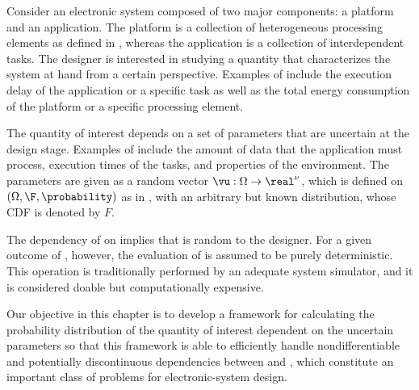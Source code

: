 Consider an electronic system composed of two major components: a platform and
an application. The platform is a collection of heterogeneous processing
elements as defined in , whereas the application is a
collection of interdependent tasks. The designer is interested in studying a
quantity \g that characterizes the system at hand from a certain perspective.
Examples of \g include the execution delay of the application or a specific task
as well as the total energy consumption of the platform or a specific processing
element.

The quantity of interest \g depends on a set of parameters \vu that are
uncertain at the design stage. Examples of \vu include the amount of data that
the application must process, execution times of the tasks, and properties of
the environment. The parameters \vu are given as a random vector $\vu: \Omega
\to \real^\nu$, which is defined on $(\Omega, \F, \probability)$ as in
, with an arbitrary but known distribution, whose
\ac{CDF} is denoted by $F$.

The dependency of \g on \vu implies that \g is random to the designer. For a
given outcome of \vu, however, the evaluation of \g is assumed to be purely
deterministic. This operation is traditionally performed by an adequate system
simulator, and it is considered doable but computationally expensive.

Our objective in this chapter is to develop a framework for calculating the
probability distribution of the quantity of interest \g dependent on the
uncertain parameters \vu so that this framework is able to efficiently handle
nondifferentiable and potentially discontinuous dependencies between \g and \vu,
which constitute an important class of problems for electronic-system design.
